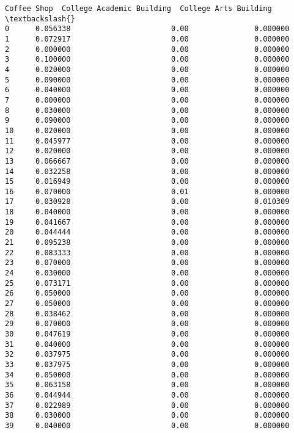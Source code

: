 \documentclass[11pt]{article}
\begin{document}
\begin{tcolorbox}[breakable, size=fbox, boxrule=.5pt, pad at break*=1mm, opacityfill=0]
\begin{Verbatim}[commandchars=\\\{\}]
    Coffee Shop  College Academic Building  College Arts Building  \textbackslash{}
0      0.056338                       0.00               0.000000
1      0.072917                       0.00               0.000000
2      0.000000                       0.00               0.000000
3      0.100000                       0.00               0.000000
4      0.020000                       0.00               0.000000
5      0.090000                       0.00               0.000000
6      0.040000                       0.00               0.000000
7      0.000000                       0.00               0.000000
8      0.030000                       0.00               0.000000
9      0.090000                       0.00               0.000000
10     0.020000                       0.00               0.000000
11     0.045977                       0.00               0.000000
12     0.020000                       0.00               0.000000
13     0.066667                       0.00               0.000000
14     0.032258                       0.00               0.000000
15     0.016949                       0.00               0.000000
16     0.070000                       0.01               0.000000
17     0.030928                       0.00               0.010309
18     0.040000                       0.00               0.000000
19     0.041667                       0.00               0.000000
20     0.044444                       0.00               0.000000
21     0.095238                       0.00               0.000000
22     0.083333                       0.00               0.000000
23     0.070000                       0.00               0.000000
24     0.030000                       0.00               0.000000
25     0.073171                       0.00               0.000000
26     0.050000                       0.00               0.000000
27     0.050000                       0.00               0.000000
28     0.038462                       0.00               0.000000
29     0.070000                       0.00               0.000000
30     0.047619                       0.00               0.000000
31     0.040000                       0.00               0.000000
32     0.037975                       0.00               0.000000
33     0.037975                       0.00               0.000000
34     0.050000                       0.00               0.000000
35     0.063158                       0.00               0.000000
36     0.044944                       0.00               0.000000
37     0.022989                       0.00               0.000000
38     0.030000                       0.00               0.000000
39     0.040000                       0.00               0.000000


\end{Verbatim}
\end{tcolorbox}
\end{document}
